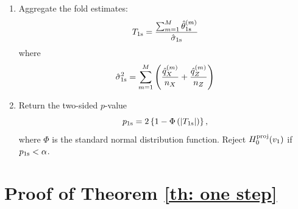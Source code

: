 \documentclass[11pt]{article}
\newenvironment{revblock}
  {\color{teal}}
  {}
\begin{document}
\begin{revblock}
\begin{enumerate}
\item Aggregate the fold estimates:
\begin{equation*}
    T_{\rm 1s}
 =
\frac{\sum_{m=1}^M\hat\theta_{\rm 1s}^{(m)}}
{\hat\sigma_{\rm 1s}} 
\end{equation*}
where
\begin{equation*}
        \hat\sigma_{\rm 1s}^2
 =
\sum_{m=1}^M
\left(\frac{\hat q_X^{(m)}}{n_X}
+\frac{\hat q_Z^{(m)}}{n_Z}\right)
\end{equation*}

\item Return the two-sided $p$-value
\[
p_{\rm 1s}=2\left\{1-\Phi\left(|T_{\rm 1s}|\right)\right\},
\]
where $\Phi$ is the standard normal distribution function.
Reject $H_0^{\rm proj}(v_1)$ if $p_{\rm 1s}<\alpha$.
\end{enumerate}
\end{revblock}

\section{Proof of Theorem \ref{th: one step}}
\label{app: debiased stat}
\end{document}
